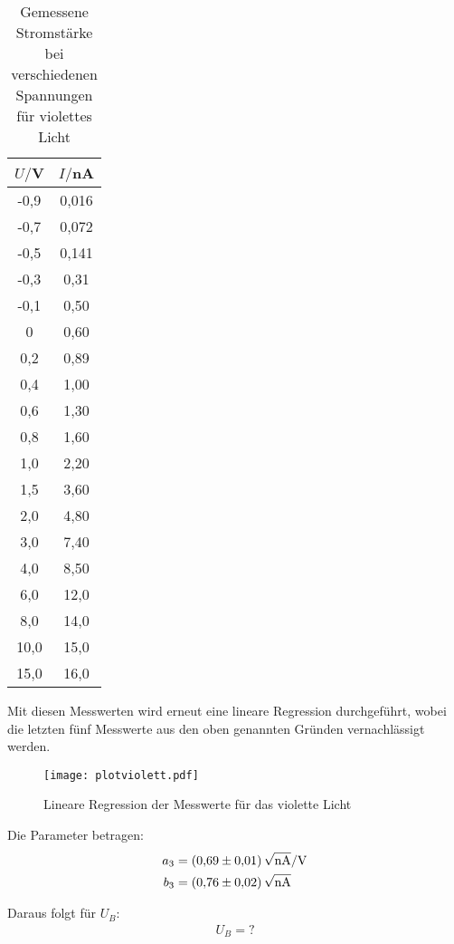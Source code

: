 \begin{table}[H]
  \centering
  \caption{Gemessene Stromstärke bei verschiedenen Spannungen für violettes Licht}
  \label{tab:Spannungsamplitude}
  \begin{tabular}{c c}
    \toprule
    $U/$V & $I/$nA \\
    \midrule
    -0,9 &	0,016 \\
    -0,7 &	0,072 \\
    -0,5 &	0,141 \\
    -0,3 &	0,31 \\
    -0,1 &	0,50 \\
    0	   &  0,60 \\
    0,2	 &  0,89 \\
    0,4	 &  1,00 \\
    0,6	 &  1,30 \\
    0,8	 &  1,60 \\
    1,0  &  2,20 \\
    1,5	 &  3,60 \\
    2,0  &  4,80 \\
    3,0  &  7,40 \\
    4,0	 &  8,50 \\
    6,0	 &  12,0 \\
    8,0	 &  14,0 \\
    10,0 &  15,0 \\
    15,0 &  16,0 \\
    \bottomrule
  \end{tabular}
\end{table}

Mit diesen Messwerten wird erneut eine lineare Regression durchgeführt, wobei die letzten fünf Messwerte
aus den oben genannten Gründen vernachlässigt werden.


\begin{figure}[H]
  \centering
  \texttt{[image: plotviolett.pdf]}
  \caption{Lineare Regression der Messwerte für das violette Licht}
  \label{fig:plot}
\end{figure}


Die Parameter betragen:
\begin{align*}
  a_3 &= \SI{0.69(1)}{\sqrt{\nano\ampere}\per\volt} \\
  b_3 &= \SI{0.76(2)}{\sqrt{\nano\ampere}}
\end{align*}

Daraus folgt für $U_B$:
\begin{align*}
  U_B = ?
\end{align*}

